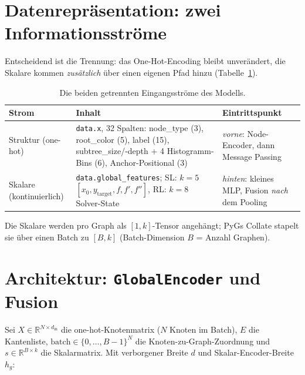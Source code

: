 \documentclass[11pt,a4paper]{article}
\newcommand{\code}[1]{\texttt{#1}}
\begin{document}
\section{Datenrepräsentation: zwei Informationsströme}

Entscheidend ist die Trennung: das One-Hot-Encoding bleibt unverändert, die Skalare
kommen \emph{zusätzlich} über einen eigenen Pfad hinzu (Tabelle~\ref{tab:streams}).

\begin{table}[h]
\centering
\small
\begin{tabular}{@{}p{2.4cm}p{6.2cm}p{4.6cm}@{}}
\toprule
\textbf{Strom} & \textbf{Inhalt} & \textbf{Eintrittspunkt} \\
\midrule
Struktur \newline (one-hot) &
\code{data.x}, 32 Spalten: node\_type (3), root\_color (5), label (15),
subtree\_size/-depth + 4 Histogramm-Bins (6), Anchor-Positional (3) &
\emph{vorne}: Node-Encoder, dann Message Passing \\[4pt]
Skalare \newline (kontinuierlich) &
\code{data.global\_features}; SL: $k{=}5$ $[x_0, y_{\text{target}}, f, f', f'']$,
RL: $k{=}8$ Solver-State &
\emph{hinten}: kleines MLP, Fusion \emph{nach} dem Pooling \\
\bottomrule
\end{tabular}
\caption{Die beiden getrennten Eingangsströme des Modells.}
\label{tab:streams}
\end{table}

Die Skalare werden pro Graph als $[1,k]$-Tensor angehängt; PyGs Collate stapelt sie
über einen Batch zu $[B,k]$ (Batch-Dimension $B$ = Anzahl Graphen).

\section{Architektur: \texorpdfstring{\code{GlobalEncoder}}{GlobalEncoder} und Fusion}

Sei $X \in \mathbb{R}^{N\times d_{\text{in}}}$ die one-hot-Knotenmatrix ($N$ Knoten im
Batch), $E$ die Kantenliste, $\text{batch}\in\{0,\dots,B-1\}^N$ die
Knoten-zu-Graph-Zuordnung und $s \in \mathbb{R}^{B\times k}$ die Skalarmatrix.
Mit verborgener Breite $d$ und Skalar-Encoder-Breite $h_g$:
\end{document}
